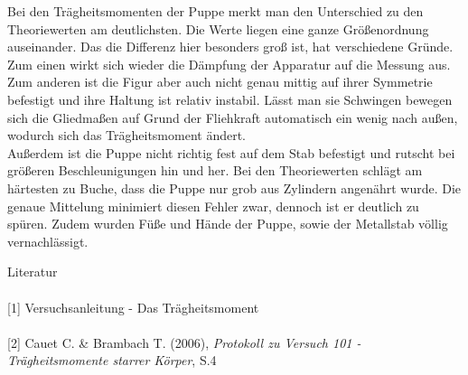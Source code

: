 Bei den Trägheitsmomenten der Puppe merkt man den Unterschied zu den Theoriewerten am deutlichsten. Die Werte liegen eine ganze Größenordnung auseinander. Das die Differenz hier besonders groß ist, hat verschiedene Gründe. Zum einen wirkt sich wieder die Dämpfung der Apparatur auf die Messung aus. Zum anderen ist die Figur aber auch nicht genau mittig auf ihrer Symmetrie befestigt und ihre Haltung ist relativ instabil. Lässt man sie Schwingen bewegen sich die Gliedmaßen auf Grund der Fliehkraft automatisch ein wenig nach außen, wodurch sich das Trägheitsmoment ändert.\\
Außerdem ist die Puppe nicht richtig fest auf dem Stab befestigt und rutscht bei größeren Beschleunigungen hin und her.
Bei den Theoriewerten schlägt am härtesten zu Buche, dass die Puppe nur grob aus Zylindern angenährt wurde. Die genaue Mittelung minimiert diesen Fehler zwar, dennoch ist er deutlich zu spüren. Zudem wurden Füße und Hände der Puppe, sowie der Metallstab völlig vernachlässigt.


\parskip 100pt
\Large{Literatur}\\\\
\large{[1] Versuchsanleitung - Das Trägheitsmoment}\\\\
\large{[2] Cauet C. \& Brambach T. (2006), \textit{Protokoll zu Versuch 101 - Trägheitsmomente starrer Körper}, S.4}\\\\





